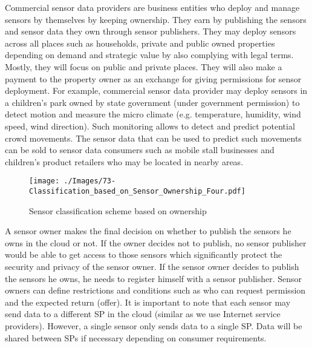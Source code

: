 \documentclass[conference]{IEEEtran}
\newenvironment{noindlist}
 {\begin{list}{\labelitemi}{\leftmargin=1.2em \itemindent=-.5em}}
 {\end{list}}
\begin{document}
\begin{noindlist}
\item Commercial sensor data providers are business entities who deploy and manage sensors by themselves by keeping ownership. They earn by publishing the sensors and sensor data they own through sensor publishers. They may deploy sensors across all places such as households, private and public owned properties depending on demand and strategic value by also complying with legal terms. Mostly, they will focus on public and private places. They will also make a payment to the property owner as an exchange for giving permissions for sensor deployment. For example, commercial sensor data provider may deploy sensors in a children's park owned by state government (under government permission) to detect motion and measure the micro climate (e.g. temperature, humidity, wind speed, wind direction). Such monitoring allows to detect and predict potential crowd movements. The sensor data that can be used to predict such movements can be sold to sensor data consumers such as mobile stall businesses and children's product retailers who may be located in nearby areas.


\end{noindlist}


\begin{figure}[t]
 \centering
\texttt{[image: ./Images/73-Classification\_based\_on\_Sensor\_Ownership\_Four.pdf]}
\caption{Sensor classification scheme based on ownership}
\label{Figure:Classification_based_on_Sensor_Ownership}	
\vspace{-0.60cm}	
\end{figure}



A sensor owner makes the final decision on whether to publish the sensors he owns in the cloud or not. If the owner decides not to publish, no sensor publisher would be able to get access to those sensors which significantly protect the security and privacy of the sensor owner. If the sensor owner decides to publish the sensors he owns, he needs to register himself with a sensor publisher. Sensor owners can define restrictions and conditions such as who can request permission and the expected return (offer). It is important to note that each sensor may send data to a different SP in the cloud (similar as we use Internet service providers). However, a single sensor only sends data to a single SP. Data will be shared between SPs if necessary depending on consumer requirements. 
\end{document}

